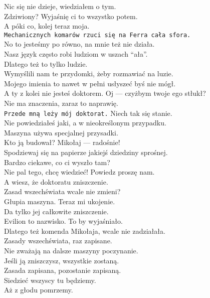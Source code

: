 \chardok{}
Nic się nie dzieje, wiedziałem o tym.\\
Zdziwiony? Wyjaśnię ci to wszystko potem.\\
A póki co, kolej teraz moja.\\
\texttt{Mechanicznych komarów rzuci się na Ferra cała sfora.}\\

\charfer{}
No to jesteśmy po równo, na mnie też nie działa.\\
Nasz język często robi ludziom w uszach "`ała"'.\\
Dlatego też to tylko ludzie.\\
Wymyślili nam te przydomki, żeby rozmawiać na luzie.\\
Mojego imienia to nawet w pełni usłyszeć byś nie mógł.\\
A ty z kolei nie jesteś doktorem. Oj --- czyżbym twoje ego stłukł?\\

\chardok{}
Nie ma znaczenia, zaraz to naprawię.\\
\texttt{Przede mną leży mój doktorat.} Niech tak się stanie.\\

\charfer{}
Nie powiedziałeś jaki, a w nieokreślonym przypadku.\\
Maszyna używa specjalnej przysadki.\\
Kto ją budował? Mikołaj --- radośnie!\\
Spodziewaj się na papierze jakiejś dziedziny sprośnej.\\
Bardzo ciekawe, co ci wyszło tam?\\
Nie pal tego, chcę wiedzieć! Powiedz proszę nam.\\
A wiesz, że doktoratu zniszczenie.\\
Zasad wszechświata wcale nie zmieni?\\

\charszam{}
Głupia maszyna. Teraz mi ukojenie.\\
Da tylko jej całkowite zniszczenie.\\

\charfer{}
Evilion to nazwisko. To by wyjaśniało.\\
Dlatego też komenda Mikołaja, wcale nie zadziałała.\\
Zasady wszechświata, raz zapisane.\\
Nie zważają na dalsze maszyny poczynanie.\\
Jeśli ją zniszczysz, wszystkie zostaną.\\
Zasada zapisana, pozostanie zapisaną.\\
Siedzieć wszyscy tu będziemy.\\
Aż z głodu pomrzemy.\\

